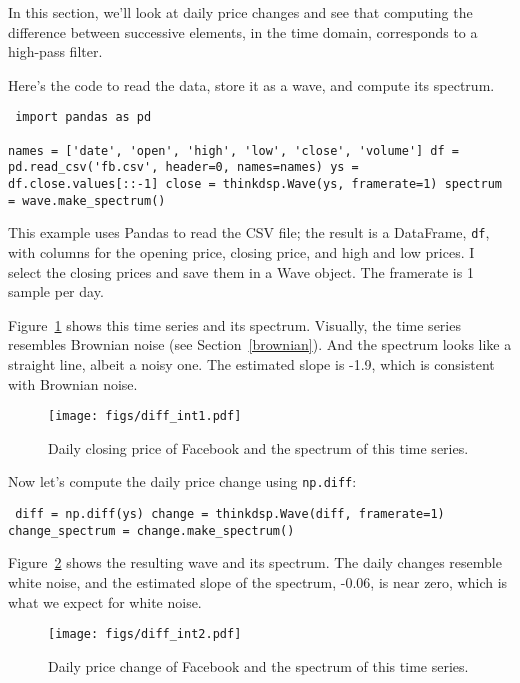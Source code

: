 \documentclass[12pt]{book} \usepackage[width=5.5in,height=8.5in, hmarginratio=3:2,vmarginratio=1:1]{geometry}
\begin{document}
In this section, we'll look at daily price changes and see that computing the difference between successive elements, in the time domain, corresponds to a high-pass filter. 

Here's the code to read the data, store it as a wave, and compute its spectrum. 

\begin{verbatim} import pandas as pd 

names = ['date', 'open', 'high', 'low', 'close', 'volume'] df = pd.read_csv('fb.csv', header=0, names=names) ys = df.close.values[::-1] close = thinkdsp.Wave(ys, framerate=1) spectrum = wave.make_spectrum() \end{verbatim} 

This example uses Pandas to read the CSV file; the result is a DataFrame, {\tt df}, with columns for the opening price, closing price, and high and low prices. I select the closing prices and save them in a Wave object. The framerate is 1 sample per day. 

Figure~\ref{fig.diff_int1} shows this time series and its spectrum. Visually, the time series resembles Brownian noise (see Section~\ref{brownian}). And the spectrum looks like a straight line, albeit a noisy one. The estimated slope is -1.9, which is consistent with Brownian noise. 

\begin{figure} 

\centerline{\texttt{[image: figs/diff\_int1.pdf]}} \caption{Daily closing price of Facebook and the spectrum of this time series.} \label{fig.diff_int1} \end{figure} 

Now let's compute the daily price change using {\tt np.diff}: 

\begin{verbatim} diff = np.diff(ys) change = thinkdsp.Wave(diff, framerate=1) change_spectrum = change.make_spectrum() \end{verbatim} 

Figure~\ref{fig.diff_int2} shows the resulting wave and its spectrum. The daily changes resemble white noise, and the estimated slope of the spectrum, -0.06, is near zero, which is what we expect for white noise. 

\begin{figure} 

\centerline{\texttt{[image: figs/diff\_int2.pdf]}} \caption{Daily price change of Facebook and the spectrum of this time series.} \label{fig.diff_int2} \end{figure} 
\end{document}
